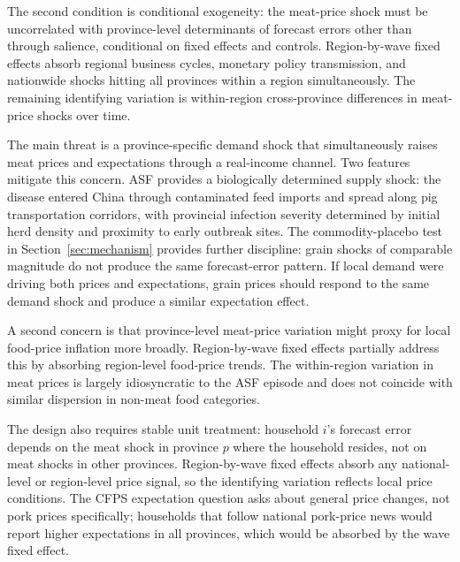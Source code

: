The second condition is conditional exogeneity: the meat-price
shock must be uncorrelated with province-level
determinants of forecast errors other than through salience,
conditional on fixed effects and controls.
Region-by-wave fixed effects absorb regional business cycles,
monetary policy transmission, and nationwide shocks hitting
all provinces within a region simultaneously.
The remaining identifying variation is within-region
cross-province differences in meat-price shocks over time.

The main threat is a province-specific demand shock that
simultaneously raises meat prices and expectations through
a real-income channel.
Two features mitigate this concern.
ASF provides a biologically determined supply shock: the
disease entered China through contaminated feed imports and
spread along pig transportation corridors, with provincial
infection severity determined by initial herd density and
proximity to early outbreak sites.
The commodity-placebo test in Section~\ref{sec:mechanism}
provides further discipline: grain shocks of comparable
magnitude do not produce the same forecast-error pattern.
If local demand were driving both prices and expectations,
grain prices should respond to the same demand shock and
produce a similar expectation effect.

A second concern is that province-level meat-price variation
might proxy for local food-price inflation more broadly.
Region-by-wave fixed effects partially address this by
absorbing region-level food-price trends.
The within-region variation in meat prices is largely
idiosyncratic to the ASF episode and does not coincide with
similar dispersion in non-meat food categories.

The design also requires stable unit treatment: household $i$'s
forecast error depends
on the meat shock in province $p$ where the household resides,
not on meat shocks in other provinces.
Region-by-wave fixed effects absorb any national-level or
region-level price signal, so the identifying variation reflects
local price conditions.
The CFPS expectation question asks about general price changes,
not pork prices specifically; households that follow national
pork-price news would report higher expectations in all
provinces, which would be absorbed by the wave fixed effect.

